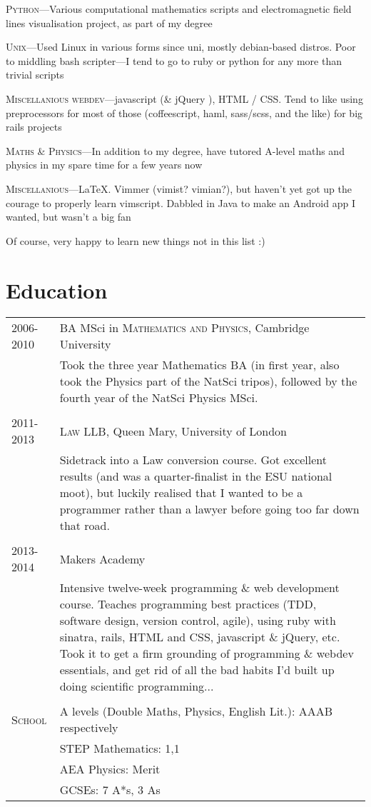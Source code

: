 \documentclass[a4paper,10pt]{article}
\begin{document}
\textsc{Python}---Various computational mathematics scripts and electromagnetic field lines visualisation project, as part of my degree

\textsc{Unix}---Used Linux in various forms since uni, mostly debian-based
distros. Poor to middling bash scripter---I tend to go to ruby or python for any more than trivial scripts

\textsc{Miscellanious webdev}---javascript (\& jQuery ), HTML / CSS. Tend to like using preprocessors for most of those (coffeescript, haml, sass/scss, and the like) for big rails projects

\textsc{Maths \& Physics}---In addition to my degree, have tutored A-level maths and physics in my spare time for a few years now

\textsc{Miscellanious}---LaTeX. Vimmer (vimist? vimian?), but haven't yet got up the courage to properly learn vimscript. Dabbled in Java to make an Android app I wanted, but wasn't a big fan

Of course, very happy to learn new things not in this list :)



\section{Education}
\begin{tabularx}{\linewidth}{>{\raggedleft\hsize=0.42\hsize}X>{\hsize=1.5\hsize}X} 
  \textsc{2006-2010} & BA MSci in \textsc{Mathematics and Physics}, Cambridge University\\
  & \footnotesize{Took the three year Mathematics BA (in first year, also took the Physics part 
  of the NatSci tripos), followed by the fourth year of the NatSci Physics MSci.} \\
  \multicolumn{2}{c}{} \\
  \textsc{2011-2013} & \textsc{Law LLB}, Queen Mary, University of
  London\\
  & \footnotesize{Sidetrack into a Law conversion course. Got excellent results (and was a 
    quarter-finalist in the ESU national moot), but luckily realised that I wanted to be a 
  programmer rather than a lawyer before going too far down that road.} \\
  \multicolumn{2}{c}{} \\
  \textsc{2013-2014} & Makers Academy \\
  & \footnotesize{Intensive twelve-week programming \& web development course.
    Teaches programming best practices (TDD, software design, version control,
    agile), using ruby with sinatra, rails, HTML and CSS, javascript \& jQuery,
    etc. Took it to get a firm grounding of programming \& webdev essentials, and
  get rid of all the bad habits I'd built up doing scientific programming...} \\
  \multicolumn{2}{c}{} \\
  \textsc{School} & \footnotesize{A levels (Double Maths, Physics, English Lit.): AAAB respectively} \\
  & \footnotesize{STEP Mathematics: 1,1} \\
  & \footnotesize{AEA Physics: Merit} \\
  & \footnotesize{GCSEs: 7 A*s, 3 As}
\end{tabularx}
\end{document}
